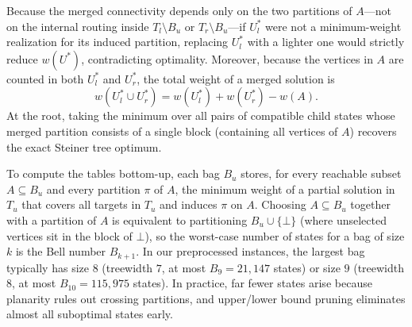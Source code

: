 \documentclass[11pt]{article}
\theoremstyle{definition}
\theoremstyle{remark}
\begin{document}
Because the merged connectivity depends only on the two partitions of $A$---not on the internal routing inside $T_l \setminus B_u$ or $T_r \setminus B_u$---if $U_l^*$ were not a minimum-weight realization for its induced partition, replacing $U_l^*$ with a lighter one would strictly reduce $w(U^*)$, contradicting optimality. Moreover, because the vertices in $A$ are counted in both $U_l^*$ and $U_r^*$, the total weight of a merged solution is
\[
    w(U_l^* \cup U_r^*) = w(U_l^*) + w(U_r^*) - w(A).
\]
At the root, taking the minimum over all pairs of compatible child states whose merged partition consists of a single block (containing all vertices of $A$) recovers the exact Steiner tree optimum.

To compute the tables bottom-up, each bag $B_u$ stores, for every reachable subset $A \subseteq B_u$ and every partition $\pi$ of $A$, the minimum weight of a partial solution in $T_u$ that covers all targets in $T_u$ and induces $\pi$ on $A$. Choosing $A \subseteq B_u$ together with a partition of $A$ is equivalent to partitioning $B_u \cup \{\bot\}$ (where unselected vertices sit in the block of $\bot$), so the worst-case number of states for a bag of size $k$ is the Bell number $B_{k+1}$. In our preprocessed instances, the largest bag typically has size $8$ (treewidth $7$, at most $B_9 = 21{,}147$ states) or size $9$ (treewidth $8$, at most $B_{10} = 115{,}975$ states). In practice, far fewer states arise because planarity rules out crossing partitions, and upper/lower bound pruning eliminates almost all suboptimal states early.
\end{document}
